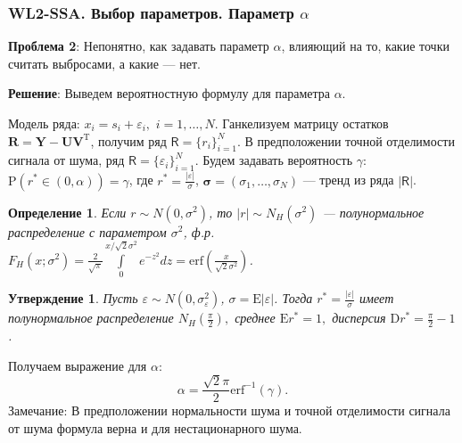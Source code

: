 \documentclass[10pt, ucs, notheorems, handout]{beamer}
\newcommand{\tX}[1]{\mathsf{#1}}
\newcommand{\E}{\mbox{E}}
\newcommand{\D}{\mbox{D}}
\newtheorem{definition}{Определение}
\newtheorem{proposition}{Утверждение}
\begin{document}
\begin{frame}
\frametitle{WL2-SSA. Выбор параметров. Параметр $\alpha$}
\footnotesize{
\textbf{Проблема 2}:
Непонятно, как задавать параметр $\alpha$, влияющий на то, какие точки считать выбросами, а какие --- нет. 

\textbf{Решение}: 
Выведем вероятностную формулу для параметра $\alpha$. 

Модель ряда: $x_i=s_i+\varepsilon_i,$ $i=1,\ldots,N$. Ганкелизуем матрицу остатков $\mathbf{R}= \mathbf{Y} - \mathbf{U}\mathbf{V}^{\mathrm{T}}$, получим ряд $\tX{R}=\{r_i\}_{i=1}^N$. В предположении точной отделимости сигнала от шума, ряд $\tX{R}=\{\varepsilon_i\}_{i=1}^N$.
Будем задавать вероятность $\gamma$: $\mathrm{P}(r^*\in (0,\alpha))=\gamma$, где $r^*=\frac{|\varepsilon|}{\sigma}$, $\bm{\sigma} =(\sigma_1,\ldots,\sigma_N)$ --- тренд из ряда $|\tX{R}|$.

\begin{definition}
	\footnotesize Если $r \sim N(0, \sigma^2)$, то $|r| \sim N_{H}(\sigma^2)$ --- \alert{полунормальное распределение} с параметром $\sigma^2$, ф.р.
	$F_H(x;\sigma^2) = \frac{2}{\sqrt{\pi}}\int\limits_{0}^{x/\sqrt{2}\sigma^2} e^{-z^2} dz = \text{erf} (\frac{x}{\sqrt{2}\sigma^2})$.
\end{definition}
\begin{proposition}
	\footnotesize Пусть $\varepsilon\sim N(0,\sigma_{\varepsilon}^2)$, $\sigma=\E |\varepsilon|$. Тогда $r^{*}=\frac{|\varepsilon|}{\sigma}$ имеет полунормальное распределение $N_H(\frac{\pi}{2}),$ среднее $\E r^* = 1,$ дисперсия $\D r^* = \frac{\pi}{2}-1$.
\end{proposition}
Получаем выражение для $\alpha$:
\begin{equation*}
\alpha = \frac{\sqrt{2}\pi}{2} \text{erf}^{-1}(\gamma).
\end{equation*}
\alert{Замечание:}
	В предположении нормальности шума и точной отделимости сигнала от шума формула верна и для нестационарного шума.  %
}
\end{frame}
\end{document}
